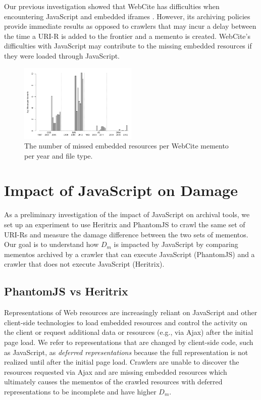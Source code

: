 Our previous investigation showed that WebCite has difficulties when encountering JavaScript and embedded iframes \cite{ijdl}. However, its archiving policies provide immediate results as opposed to crawlers that may incur a delay between the time a URI-R is added to the frontier and a memento is created. WebCite's difficulties with JavaScript may contribute to the missing embedded resources if they were loaded through JavaScript.


\begin{figure}[h!]
\includegraphics[width=0.5\textwidth]{./imgs/FileTypes_webcite.png}
\caption{The number of missed embedded resources per WebCite memento per year and file type.
}
\label{occstatsWC}
\end{figure}


\section{Impact of JavaScript on Damage}
\label{wcjs}


As a preliminary investigation of the impact of JavaScript on archival tools, we set up an experiment to use Heritrix and PhantomJS to crawl the same set of URI-Rs and measure the damage difference between the two sets of mementos. Our goal is to understand how $D_m$ is impacted by JavaScript by comparing mementos archived by a crawler that can execute JavaScript (PhantomJS) and a crawler that does not execute JavaScript (Heritrix).

\subsection{PhantomJS vs Heritrix}
\label{pjsvhtrix}
Representations of Web resources are increasingly reliant on JavaScript and other client-side technologies to load embedded resources and control the activity on the client or request additional data or resources (e.g., via Ajax) after the initial page load. We refer to representations that are changed by client-side code, such as JavaScript, as \emph{deferred representations} because the full representation is not realized until after the initial page load. 
Crawlers are unable to discover the resources requested via Ajax and are missing embedded resources which ultimately causes the mementos of the crawled resources with deferred representations to be incomplete and have higher $D_m$. 

